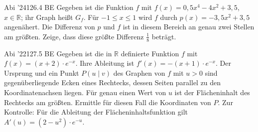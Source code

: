 \documentclass[11pt]{article}
\begin{document}
\pfgruppe{}
\begin{pfaufg}{Abi ’24}{126.}{4 BE}
Gegeben ist die Funktion $f$ mit $f(x) = 0{,}5x^4 - 4x^2 + 3{,}5$, $x \in \mathbb{R}$; ihr Graph heißt $G_f$. Für $-1 \le x \le 1$ wird $f$ durch $p(x) = -3{,}5x^2 + 3{,}5$ angenähert. Die Differenz von $p$ und $f$ ist in diesem Bereich an genau zwei Stellen am größten. Zeige, dass diese größte Differenz $\tfrac{1}{8}$ beträgt.
\end{pfaufg}
\pfgruppe{}
\begin{pfaufg}{Abi ’22}{127.}{5 BE}
Gegeben ist die in $\mathbb{R}$ definierte Funktion $f$ mit $f(x) = (x + 2)\cdot e^{-x}$. Ihre Ableitung ist $f'(x) = -(x + 1)\cdot e^{-x}$. Der Ursprung und ein Punkt $P(u \mid v)$ des Graphen von $f$ mit $u > 0$ sind gegenüberliegende Ecken eines Rechtecks, dessen Seiten parallel zu den Koordinatenachsen liegen. Für genau einen Wert von $u$ ist der Flächeninhalt des Rechtecks am größten. Ermittle für diesen Fall die Koordinaten von $P$. Zur Kontrolle: Für die Ableitung der Flächeninhaltsfunktion gilt $A'(u) = (2 - u^2)\cdot e^{-u}$.
\end{pfaufg}
\end{document}
